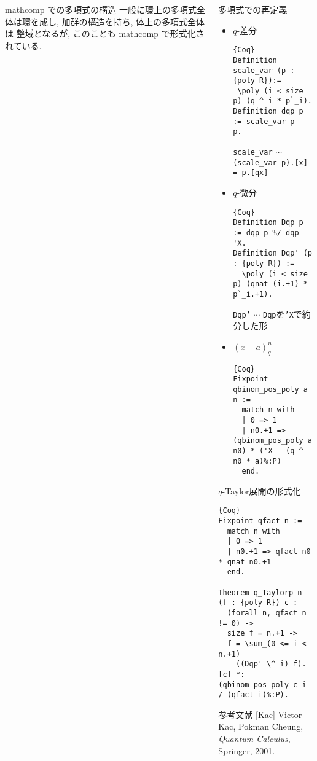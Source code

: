 \documentclass[unicode,mathserif]{beamer}
\begin{document}
\begin{frame}[fragile]
\begin{columns}[T]
\begin{column}{0.33\columnwidth}
		\begin{block}{mathcomp での多項式の構造}
			一般に環上の多項式全体は環を成し, 加群の構造を持ち, 体上の多項式全体は
			整域となるが, このことも mathcomp で形式化されている. 
		\end{block}
	\end{column}

	\begin{column}{0.33\columnwidth}
		\begin{block}{多項式での再定義}
			\begin{itemize}
			\item $q$-差分
			\begin{lstlisting}{Coq}
Definition scale_var (p : {poly R}):=
 \poly_(i < size p) (q ^ i * p`_i).
Definition dqp p := scale_var p - p. \end{lstlisting}
		{\tt scale\_var} $\cdots$ {\tt (scale\_var p).[x] = p.[qx]}
			\item $q$-微分
			\begin{lstlisting}{Coq}
Definition Dqp p := dqp p %/ dqp 'X.
Definition Dqp' (p : {poly R}) :=
  \poly_(i < size p) (qnat (i.+1) * p`_i.+1). \end{lstlisting}
		{\tt Dqp'} $\cdots$ {\tt Dqp}を{\tt 'X}で約分した形
			\item $(x - a)^n_q$
			\begin{lstlisting}{Coq}
Fixpoint qbinom_pos_poly a n :=
  match n with
  | 0 => 1
  | n0.+1 => (qbinom_pos_poly a n0) * ('X - (q ^ n0 * a)%:P)
  end. \end{lstlisting}
  			\end{itemize}
		\end{block}

		\begin{block}{$q$-Taylor展開の形式化}
			\begin{lstlisting}{Coq}
Fixpoint qfact n :=
  match n with
  | 0 => 1
  | n0.+1 => qfact n0 * qnat n0.+1
  end.

Theorem q_Taylorp n (f : {poly R}) c :
  (forall n, qfact n != 0) ->
  size f = n.+1 ->
  f = \sum_(0 <= i < n.+1)
    ((Dqp' \^ i) f).[c] *: (qbinom_pos_poly c i / (qfact i)%:P).
\end{lstlisting}
		\end{block}
		
		\begin{block}{参考文献}
			[Kac] Victor Kac, Pokman Cheung, {\it{Quantum Calculus}}, Springer, 2001.
		\end{block}
			
	\end{column}
	\end{columns}
\end{frame}
\end{document}

